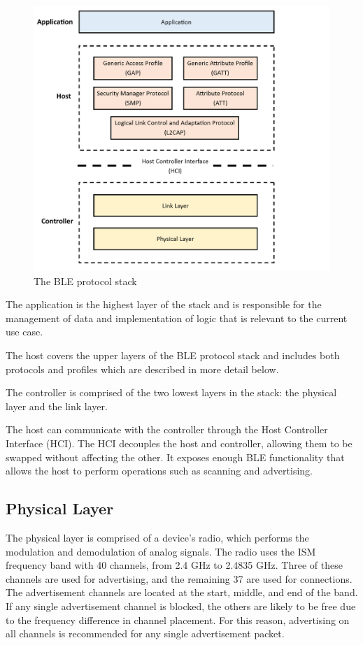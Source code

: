     \FloatBarrier
    \begin{figure}[ht]
      \includegraphics[width=\textwidth]{Images/chapter3/ble_stack.png}
      \caption{The BLE protocol stack}
      \label{fig:ble_stack}
    \end{figure}
    \FloatBarrier

    The application is the highest layer of the stack and is responsible for the
    management of data and implementation of logic that is relevant to the current
    use case.

    The host covers the upper layers of the BLE protocol stack and includes both
    protocols and profiles which are described in more detail below.

    The controller is comprised of the two lowest layers in the stack: the physical
    layer and the link layer.

    The host can communicate with the controller through the Host Controller Interface
    (HCI). The HCI decouples the host and controller, allowing them to be swapped
    without affecting the other. It exposes enough BLE functionality that allows
    the host to perform operations such as scanning and advertising.

      \subsection{Physical Layer}
    The physical layer is comprised of a device's radio, which performs the
    modulation and demodulation of analog signals. The radio uses the
    ISM frequency band with 40 channels, from 2.4 GHz to 2.4835 GHz. Three of these
    channels are used for advertising, and the remaining 37 are used for
    connections. The advertisement channels are located at the start, middle,
    and end of the band. If any single advertisement channel is blocked, the others
    are likely to be free due to the frequency difference in channel placement.
    For this reason, advertising on all channels is recommended for any single
    advertisement packet.

